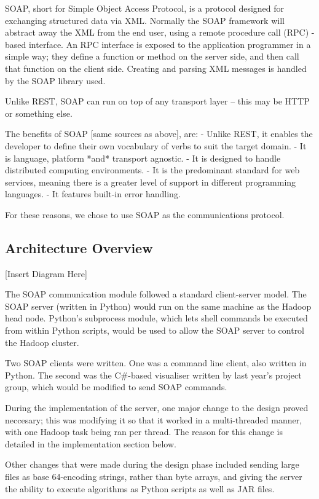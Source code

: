 SOAP, short for Simple Object Access Protocol, is a protocol designed for exchanging structured data via XML. Normally the SOAP framework will abstract away the XML from the end user, using a remote procedure call (RPC) -based interface. An RPC interface is exposed to the application programmer in a simple way; they define a function or method on the server side, and then call that function on the client side. Creating and parsing XML messages is handled by the SOAP library used.

Unlike REST, SOAP can run on top of any transport layer -- this may be HTTP or something else.

The benefits of SOAP [same sources as above], are:
- Unlike REST, it enables the developer to define their own vocabulary of verbs to suit the target domain.
- It is language, platform *and* transport agnostic.
- It is designed to handle distributed computing environments.
- It is the predominant standard for web services, meaning there is a greater level of support in different programming languages.
- It features built-in error handling.

For these reasons, we chose to use SOAP as the communications protocol.

\subsection{Architecture Overview}

[Insert Diagram Here]

The SOAP communication module followed a standard client-server model. The SOAP server (written in Python) would run on the same machine as the Hadoop head node. Python's subprocess module, which lets shell commands be executed from within Python scripts, would be used to allow the SOAP server to control the Hadoop cluster.

Two SOAP clients were written. One was a command line client, also written in Python. The second was the C\#-based visualiser written by last year's project group, which would be modified to send SOAP commands.

During the implementation of the server, one major change to the design proved neccesary; this was modifying it so that it worked in a multi-threaded manner, with one Hadoop task being ran per thread. The reason for this change is detailed in the implementation section below.

Other changes that were made during the design phase included sending large files as base 64-encoding strings, rather than byte arrays, and giving the server the ability to execute algorithms as Python scripts as well as JAR files.

